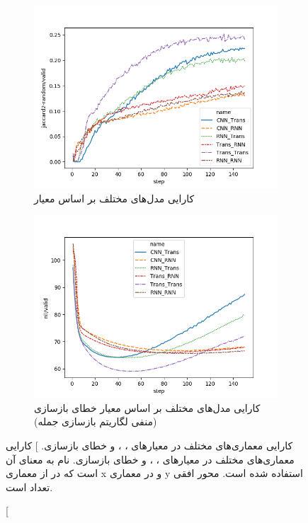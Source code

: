 \begin{figure}[h]
\begin{subfigure}{0.3\textheight}
		\centering
		\includegraphics[width=1.\textwidth]{images/figs/jaccard2-random.png}
		\caption{کارایی مدل‌های مختلف بر اساس معیار \jaccard[-2]{}}
		\label{fig:chap4:archs_jac}
	\end{subfigure}
	\begin{subfigure}{0.3\textheight}
		\centering
		\includegraphics[width=1.\textwidth]{images/figs/nll.png}
		\caption{
			کارایی مدل‌های مختلف بر اساس معیار خطای بازسازی (منفی لگاریتم \likelihood{} باز‌سازی جمله)}
		\label{fig:chap4:archs_nll}
	\end{subfigure}
	\caption
	[
		کارایی معماری‌های مختلف در معیارهای
		،
		،
		و خطای بازسازی.
	]
	{
		کارایی معماری‌های مختلف در معیارهای \bleu[-2]{}، \selfbleu[-2]{}، \jaccard[-2]{} و خطای بازسازی.
		نام  به معنای آن است که در \encoder{} از معماری x و در \decoder{} معماری y استفاده شده است. محور افقی تعداد  است.}
	\label{fig:chap4:archs}
\end{figure}

